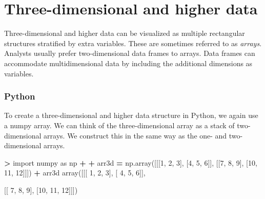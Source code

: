 \documentclass[
]{book}
\newenvironment{Shaded}{\begin{snugshade}}{\end{snugshade}}
\newcommand{\DecValTok}[1]{\textcolor[rgb]{0.00,0.00,0.81}{#1}}
\newcommand{\ImportTok}[1]{#1}
\newcommand{\NormalTok}[1]{#1}
\newcommand{\OperatorTok}[1]{\textcolor[rgb]{0.81,0.36,0.00}{\textbf{#1}}}
\begin{document}
\hypertarget{three-dimensional-and-higher-data}{%
\section{Three-dimensional and higher data}\label{three-dimensional-and-higher-data}}

Three-dimensional and higher data can be visualized as multiple rectangular structures stratified by extra variables. These are sometimes referred to as \emph{arrays}. Analysts usually prefer two-dimensional data frames to arrays. Data frames can accommodate multidimensional data by including the additional dimensions as variables.

\hypertarget{python-10}{%
\subsubsection*{Python}\label{python-10}}

To create a three-dimensional and higher data structure in Python, we again use a numpy array. We can think of the three-dimensional array as a stack of two-dimensional arrays. We construct this in the same way as the one- and two-dimensional arrays.

\begin{Shaded}
\begin{Highlighting}[]
\OperatorTok{\textgreater{}} \ImportTok{import}\NormalTok{ numpy }\ImportTok{as}\NormalTok{ np }
\OperatorTok{+} 
\OperatorTok{+}\NormalTok{ arr3d }\OperatorTok{=}\NormalTok{ np.array([[[}\DecValTok{1}\NormalTok{, }\DecValTok{2}\NormalTok{, }\DecValTok{3}\NormalTok{], [}\DecValTok{4}\NormalTok{, }\DecValTok{5}\NormalTok{, }\DecValTok{6}\NormalTok{]], [[}\DecValTok{7}\NormalTok{, }\DecValTok{8}\NormalTok{, }\DecValTok{9}\NormalTok{], [}\DecValTok{10}\NormalTok{, }\DecValTok{11}\NormalTok{, }\DecValTok{12}\NormalTok{]]])}
\OperatorTok{+}\NormalTok{ arr3d}
\NormalTok{array([[[ }\DecValTok{1}\NormalTok{,  }\DecValTok{2}\NormalTok{,  }\DecValTok{3}\NormalTok{],}
\NormalTok{        [ }\DecValTok{4}\NormalTok{,  }\DecValTok{5}\NormalTok{,  }\DecValTok{6}\NormalTok{]],}

\NormalTok{       [[ }\DecValTok{7}\NormalTok{,  }\DecValTok{8}\NormalTok{,  }\DecValTok{9}\NormalTok{],}
\NormalTok{        [}\DecValTok{10}\NormalTok{, }\DecValTok{11}\NormalTok{, }\DecValTok{12}\NormalTok{]]])}
\end{Highlighting}
\end{Shaded}
\end{document}
